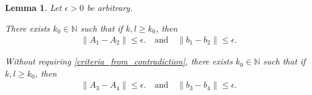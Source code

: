 \documentclass{article}
\newtheorem{lemma}[theorem]{Lemma}
\theoremstyle{case}
\numberwithin{theorem}{subsection}
\newcommand{\naturals}{\mathbb N}
\begin{document}
\begin{lemma}
\label{the_polyhedron_are_close}
Let $\epsilon > 0$ be arbitrary.

There exists $k_0 \in \naturals$ such that if $k, l \ge k_0$, then
\begin{align*}
\left\|A_1 - A_2\right\| \le \epsilon.
\quad \textrm{and} \quad
\left\|b_1 - b_2\right\| \le \epsilon.
\end{align*}

Without requiring \cref{criteria_from_contradiction},
there exists $k_0 \in \naturals$ such that if $k, l \ge k_0$, then
\begin{align*}
\left\|A_3 - A_4\right\| \le \epsilon.
\quad \textrm{and} \quad
\left\|b_3 - b_4\right\| \le \epsilon.
\end{align*}


\end{lemma}
\end{document}
